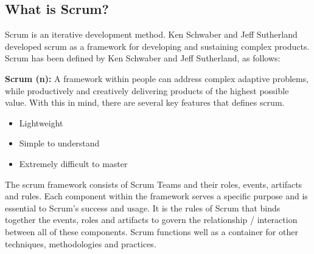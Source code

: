 \subsection{What is Scrum?}


Scrum is an iterative development method\cite{scrumguide11}.
Ken Schwaber and Jeff Sutherland developed scrum as a framework for developing and sustaining complex products\cite{scrumguide11}. Scrum has been defined by Ken Schwaber and Jeff Sutherland, as follows:


\textbf{Scrum (n):} A framework within people can address complex adaptive problems, while productively and creatively delivering products of the highest possible value\cite{scrumguide11}.
With this in mind, there are several key features that defines scrum\cite{scrumguide11}.


\begin{itemize}
	\item Lightweight
	\item Simple to understand
	\item Extremely difficult to master
\end{itemize}


The scrum framework consists of Scrum Teams and their roles, events, artifacts and rules\cite{scrumguide11}. Each component within the framework serves a specific purpose and is essential to Scrum's success and usage\cite{scrumguide11}. 
It is the rules of Scrum that binds together the events, roles and artifacts to govern the relationship / interaction between all of these components\cite{scrumguide11}. Scrum functions well as a container for other techniques, methodologies and practices\cite{scrumguide11}.


